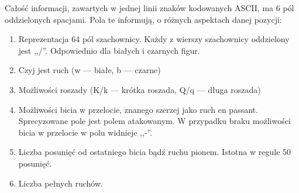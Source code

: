 Całość informacji, zawartych w jednej linii znaków kodowanych ASCII, ma 6 pól oddzielonych spacjami.
Pola te informują, o różnych aspektach danej pozycji:

\begin{enumerate}
    \item Reprezentacja 64 pól szachownicy.
    Każdy z wierszy szachownicy oddzielony jest ,,/''.
    Odpowiednio dla białych i czarnych figur.
    \item Czyj jest ruch (w — białe, b — czarne)
    \item Możliwości roszady (K/k — krótka roszada, Q/q — długa roszada)
    \item Możliwości bicia w przelocie, znanego szerzej jako ruch en passant.
    Sprecyzowane pole jest polem atakowanym.
    W przypadku braku możliwości bicia w przelocie w polu widnieje ,,-''.
    \item Liczba posunięć od ostatniego bicia bądź ruchu pionem.
    Istotna w regule 50 posunięć.
    \item Liczba pełnych ruchów.
\end{enumerate}
